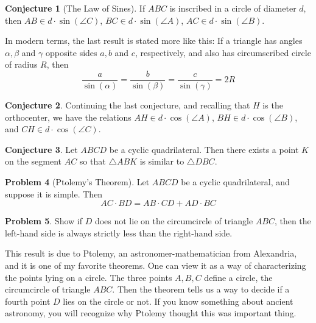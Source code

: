 \documentclass{amsart}
\theoremstyle{definition}
\newtheorem{problem}{Problem}[section]
\newtheorem{conjecture}[problem]{Conjecture}
\begin{document}
\begin{conjecture}[The Law of Sines]
If $ABC$ is inscribed in a circle of diameter $d$, then $AB \in d\cdot \sin(\angle C)$, $BC \in d\cdot \sin(\angle A)$, $AC \in d\cdot \sin(\angle B)$.
\end{conjecture}

In modern terms, the last result is stated more like this: If a triangle has angles $\alpha, \beta$ and $\gamma$ opposite sides $a, b$ and $c$, respectively, and also has circumscribed circle of radius $R$, then
\[
\dfrac{a}{\sin(\alpha)} = \dfrac{b}{\sin(\beta)} = \dfrac{c}{\sin(\gamma)} = 2R
\]



\begin{conjecture}
Continuing the last conjecture, and recalling that $H$ is the orthocenter, we have the relations $AH \in d\cdot \cos(\angle A)$, $BH \in d\cdot \cos(\angle B)$, and $CH \in d\cdot \cos(\angle C)$.
\end{conjecture}



\begin{conjecture}
Let $ABCD$ be a cyclic quadrilateral. Then there exists a point $K$ on the segment $AC$ so that $\triangle ABK$ is similar to $\triangle DBC$.
\end{conjecture}



\begin{problem}[Ptolemy's Theorem]\label{prob:ptolemy-theorem}
Let $ABCD$ be a cyclic quadrilateral, and suppose it is simple. Then
\[  
AC\cdot BD = AB\cdot CD + AD\cdot BC
\]
\end{problem}

\begin{problem}
Show if $D$ does not lie on the circumcircle of triangle $ABC$, then the left-hand side is always strictly less than the right-hand side.
\end{problem}

This result is due to Ptolemy, an astronomer-mathematician from Alexandria, and it is one of my favorite theorems. One can view it as a way of characterizing the points lying on a circle. The three points $A, B, C$ define a circle, the circumcircle of triangle $ABC$. Then the theorem tells us a way to decide if a fourth point $D$ lies on the circle or not. If you know something about ancient astronomy, you will recognize why Ptolemy thought this was important thing. \\
\end{document}
